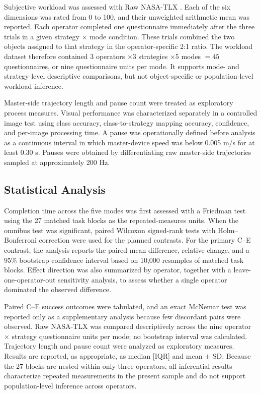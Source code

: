 Subjective workload was assessed with Raw NASA-TLX \cite{ref27}. Each of the six dimensions was rated from 0 to 100, and their unweighted arithmetic mean was reported. Each operator completed one questionnaire immediately after the three trials in a given strategy $\times$ mode condition. These trials combined the two objects assigned to that strategy in the operator-specific 2:1 ratio. The workload dataset therefore contained $3$ operators $\times 3$ strategies $\times 5$ modes $=45$ questionnaires, or nine questionnaire units per mode. It supports mode- and strategy-level descriptive comparisons, but not object-specific or population-level workload inference.

Master-side trajectory length and pause count were treated as exploratory process measures. Visual performance was characterized separately in a controlled image test using class accuracy, class-to-strategy mapping accuracy, confidence, and per-image processing time. A pause was operationally defined before analysis as a continuous interval in which master-device speed was below 0.005 m/s for at least 0.30 s. Pauses were obtained by differentiating raw master-side trajectories sampled at approximately 200 Hz.

\subsection{Statistical Analysis}
Completion time across the five modes was first assessed with a Friedman test using the 27 matched task blocks as the repeated-measures units. When the omnibus test was significant, paired Wilcoxon signed-rank tests with Holm--Bonferroni correction were used for the planned contrasts. For the primary C--E contrast, the analysis reports the paired mean difference, relative change, and a 95\% bootstrap confidence interval based on 10,000 resamples of matched task blocks. Effect direction was also summarized by operator, together with a leave-one-operator-out sensitivity analysis, to assess whether a single operator dominated the observed difference.

Paired C--E success outcomes were tabulated, and an exact McNemar test was reported only as a supplementary analysis because few discordant pairs were observed. Raw NASA-TLX was compared descriptively across the nine operator $\times$ strategy questionnaire units per mode; no bootstrap interval was calculated. Trajectory length and pause count were analyzed as exploratory measures. Results are reported, as appropriate, as median [IQR] and mean $\pm$ SD. Because the 27 blocks are nested within only three operators, all inferential results characterize repeated measurements in the present sample and do not support population-level inference across operators.
